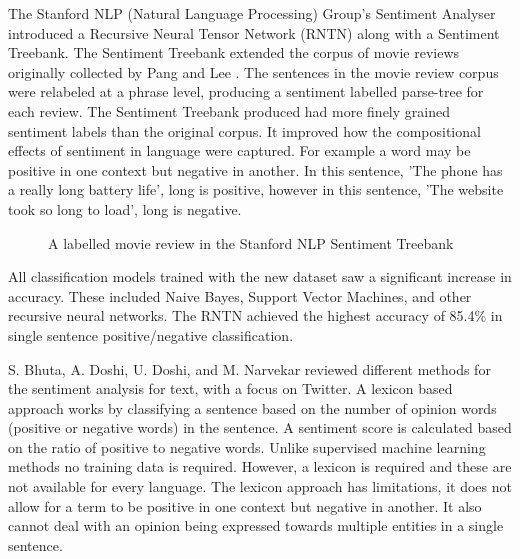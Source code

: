 The Stanford NLP (Natural Language Processing) Group's Sentiment Analyser \cite{stanfordSentiment2013} introduced a Recursive Neural Tensor Network (RNTN) along with a Sentiment Treebank. The Sentiment Treebank extended the corpus of movie reviews originally collected by Pang and Lee \cite{panglee2004}. The sentences in the movie review corpus were relabeled at a phrase level, producing a sentiment labelled parse-tree for each review. The Sentiment Treebank produced had more finely grained sentiment labels than the original corpus. It improved how the compositional effects of sentiment in language were captured. For example a word may be positive in one context but negative in another. In this sentence, 'The phone has a really long battery life', long is positive, however in this sentence, 'The website took so long to load', long is negative.

\begin{figure}
    \centering
    \setlength{\fboxsep}{0pt}
    \setlength{\fboxrule}{0.01pt}
    \setlength{\belowcaptionskip}{-20pt}
    \caption{A labelled movie review in the Stanford NLP Sentiment Treebank \cite{stanfordSentiment2013}}
\end{figure}

All classification models trained with the new dataset saw a significant increase in accuracy. These included Naive Bayes, Support Vector Machines, and other recursive neural networks. The RNTN achieved the highest accuracy of 85.4\% in single sentence positive/negative classification.

S. Bhuta, A. Doshi, U. Doshi, and M. Narvekar \cite{Bhuta2014} reviewed different methods for the sentiment analysis for text, with a focus on Twitter. A lexicon based approach works by classifying a sentence based on the number of opinion words (positive or negative words) in the sentence. A sentiment score is calculated based on the ratio of positive to negative words. Unlike supervised machine learning methods no training data is required. However, a lexicon is required and these are not available for every language. The lexicon approach has limitations, it does not allow for a term to be positive in one context but negative in another. It also cannot deal with an opinion being expressed towards multiple entities in a single sentence.

